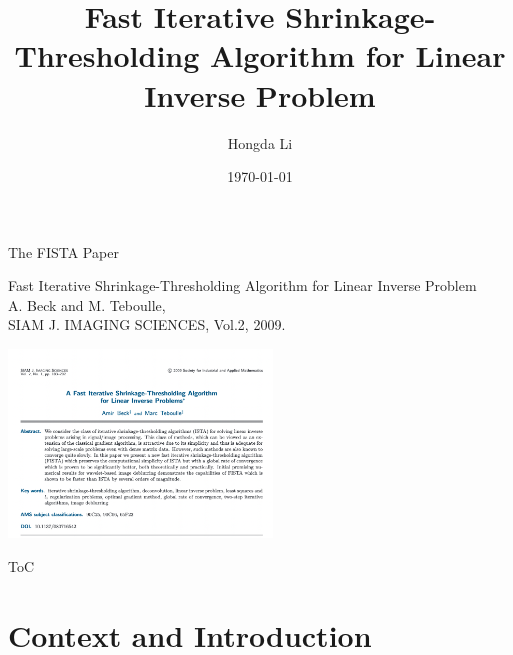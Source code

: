 \documentclass[11pt]{beamer}
\author[Hongda Li]{Hongda Li}
\title{Fast Iterative Shrinkage-Thresholding Algorithm for Linear Inverse Problem}
\institute[]{UBC Okanagan}
\date{\today}
\begin{document}
\begin{frame}
    \titlepage
\end{frame}
\begin{frame}{The FISTA Paper}
    \begin{center}
        Fast Iterative Shrinkage-Thresholding Algorithm for Linear Inverse Problem
        \\
        {\footnotesize
            A. Beck and M. Teboulle,
            \\ SIAM J. IMAGING SCIENCES, Vol.2, 2009. 
        }
    \end{center}
    \begin{center}
        \includegraphics[width=7cm]{screen_shot_paper.png}    
    \end{center}
\end{frame}
\begin{frame}{ToC}
    \tableofcontents
\end{frame}

\section{Context and Introduction}
    
\end{document}
